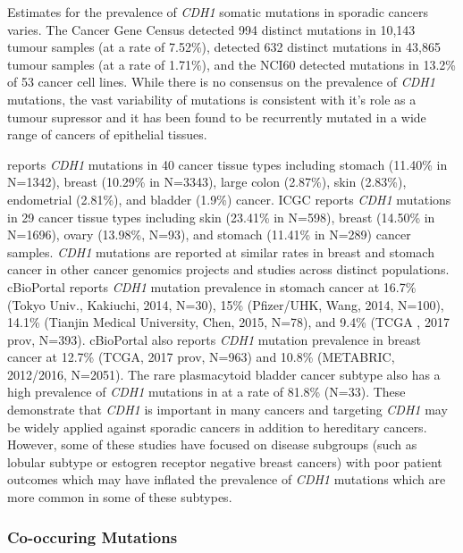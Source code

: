Estimates for the prevalence of \textit{CDH1} somatic mutations  in sporadic cancers varies. The Cancer Gene Census \citep{Futreal2004, Pleasance2010} detected 994 distinct mutations in 10,143 tumour samples (at a rate of 7.52\%), \citet{COSMICdb} detected 632 distinct mutations in 43,865 tumour samples (at a rate of 1.71\%), and the NCI60 detected mutations in 13.2\% of 53 cancer cell lines. While there is no consensus on the prevalence of \textit{CDH1} mutations, the vast variability of mutations is consistent with it's role as a tumour supressor and it has been found to be recurrently mutated in a wide range of cancers of epithelial tissues.

\citet{COSMICdb} reports \textit{CDH1} mutations in 40 cancer tissue types including stomach (11.40\% in N=1342), breast (10.29\% in N=3343), large colon (2.87\%), skin (2.83\%), endometrial (2.81\%), and bladder (1.9\%) cancer. ICGC reports \textit{CDH1} mutations in 29 cancer tissue types including skin (23.41\% in N=598), breast (14.50\% in N=1696), ovary (13.98\%, N=93), and stomach (11.41\% in N=289) cancer samples. \textit{CDH1} mutations are reported at similar rates in breast and stomach cancer in other cancer genomics projects and studies across distinct populations. cBioPortal reports \textit{CDH1} mutation prevalence in stomach cancer at 16.7\% (Tokyo Univ., Kakiuchi, 2014, N=30), 15\% (Pfizer/UHK,  Wang, 2014, N=100), 14.1\% (Tianjin Medical University, Chen, 2015, N=78), and 9.4\% (TCGA , 2017 prov, N=393). cBioPortal also reports \textit{CDH1} mutation prevalence in breast cancer at 12.7\% (TCGA, 2017 prov, N=963) and 10.8\% (METABRIC, 2012/2016, N=2051). The rare plasmacytoid bladder cancer subtype also has a high prevalence of \textit{CDH1} mutations in \citet{COSMICdb} at a rate of 81.8\% (N=33). These demonstrate that \textit{CDH1} is important in many cancers and targeting \textit{CDH1} may be widely applied against sporadic cancers in addition to hereditary cancers. However, some of these studies have focused on disease subgroups (such as lobular subtype or estogren receptor negative breast cancers) with poor patient outcomes which may have inflated the prevalence of \textit{CDH1} mutations which are more common in some of these subtypes.

\subsubsection{Co-occuring Mutations}

